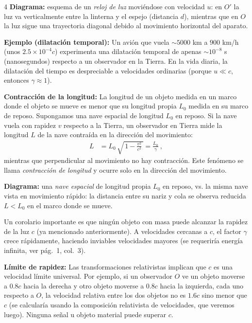\documentclass[landscape,10pt]{article}
\begin{document}
\begin{multicols}{4}
\textbf{Diagrama:} esquema de un \emph{reloj de luz} moviéndose con velocidad $u$: en $O'$ la luz va verticalmente entre la linterna y el espejo (distancia $d$), mientras que en $O$ la luz sigue una trayectoria diagonal debido al movimiento horizontal del aparato.

\medskip \noindent \textbf{Ejemplo (dilatación temporal):} Un avión que vuela $\sim\!5000$ km a $900$ km/h (unos $2.5\times10^{-4}c$) experimenta una dilatación temporal de apenas $\sim10^{-8}$ s (nanosegundos) respecto a un observador en la Tierra. En la vida diaria, la dilatación del tiempo es despreciable a velocidades ordinarias (porque $u \ll c$, entonces $\gamma \approx 1$).

\columnbreak
\noindent \textbf{Contracción de la longitud:} La longitud de un objeto medida en un marco donde el objeto se mueve es menor que su longitud propia $L_0$ medida en su marco de reposo. Supongamos una nave espacial de longitud $L_0$ en reposo. Si la nave vuela con rapidez $v$ respecto a la Tierra, un observador en Tierra mide la longitud $L$ de la nave contraída en la dirección del movimiento:
\begin{align*}
L &= L_0\,\sqrt{\,1 - \frac{v^2}{c^2}\,} = \frac{L_0}{\gamma}~,
\end{align*}
mientras que perpendicular al movimiento no hay contracción. Este fenómeno se llama \emph{contracción de longitud} y ocurre solo en la dirección del movimiento.

\textbf{Diagrama:} una \emph{nave espacial} de longitud propia $L_0$ en reposo, vs. la misma nave vista en movimiento rápido: la distancia entre su nariz y cola se observa reducida $L < L_0$ en el marco donde se mueve.

Un corolario importante es que ningún objeto con masa puede alcanzar la rapidez de la luz $c$ (ya mencionado anteriormente). A velocidades cercanas a $c$, el factor $\gamma$ crece rápidamente, haciendo inviables velocidades mayores (se requeriría energía infinita, ver pág.~1, col.~3).

\columnbreak
\noindent \textbf{Límite de rapidez:} Las transformaciones relativistas implican que $c$ es una velocidad límite universal. Por ejemplo, si un observador $O$ ve un objeto moverse a $0.8c$ hacia la derecha y otro objeto moverse a $0.8c$ hacia la izquierda, cada uno respecto a $O$, la velocidad relativa entre los dos objetos no es $1.6c$ sino menor que $c$ (se calcularía usando la composición relativista de velocidades, que veremos luego). Ninguna señal u objeto material puede superar $c$.


\end{multicols}
\end{document}
